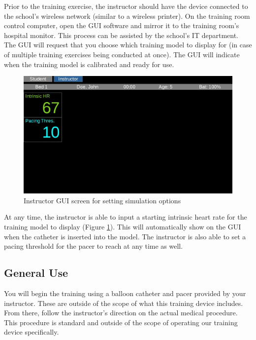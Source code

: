 \documentclass[12pt, titlepage]{article}
\begin{document}
Prior to the training exercise, the instructor should have the device connected to the school's wireless network (similar to a wireless printer). On the training room control computer, open the GUI software and mirror it to the training room's hospital monitor. This process can be assisted by the school's IT department. The GUI will request that you choose which training model to display for (in case of multiple training exercises being conducted at once). The GUI will indicate when the training model is calibrated and ready for use.

\begin{figure}[H]
\centering
\includegraphics[scale=0.5]{gui-teacher}
\caption{Instructor GUI screen for setting simulation options}
\label{fig:teacher}
\end{figure}

At any time, the instructor is able to input a starting intrinsic heart rate for the training model to display (Figure \ref{fig:teacher}). This will automatically show on the GUI when the catheter is inserted into the model. The instructor is also able to set a pacing threshold for the pacer to reach at any time as well.

\subsection{General Use}
You will begin the training using a balloon catheter and pacer provided by your instructor. These are outside of the scope of what this training device includes. From there, follow the instructor's direction on the actual medical procedure. This procedure is standard and outside of the scope of operating our training device specifically.
\end{document}
